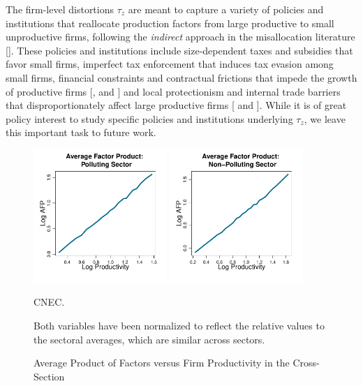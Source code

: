 \documentclass[AEJ]{AEA}
\begin{document}
The firm-level distortions $\tau_z$ are meant to capture a variety of policies and institutions that reallocate production factors from large productive to small unproductive firms, following the \emph{indirect} approach in the misallocation literature [\citet{RestucciaRogerson:2013,RestucciaRogerson:2017}]. These policies and institutions include size-dependent taxes and subsidies that favor small firms, imperfect tax enforcement that induces tax evasion among small firms, financial constraints and contractual frictions that impede the growth of productive firms [\citet{CooleyQuadrini:2001}, \citet{ClementiHopenhayn:2006} and \citet{Akcigitetal:2018}] and local protectionism and internal trade barriers that disproportionately affect large productive firms [\citet{Eberhardtetal:2016} and \citet{TombeZhu:2015}]. While it is of great policy interest to study specific policies and institutions underlying $\tau_z$, we leave this important task to future work.

\begin{figure}[t]
    \begin{center}
    \includegraphics[width=0.45\textwidth]{./Figures/apf_pol_weight.pdf}
    \includegraphics[width=0.45\textwidth]{./Figures/apf_npol_weight.pdf}
    \caption{Average Product of Factors versus Firm Productivity in the Cross-Section}
    \begin{figurenotes}[Source]
        CNEC.
    \end{figurenotes}
    \begin{figurenotes}
        Both variables have been normalized to reflect the relative values to the sectoral averages, which are similar across sectors.
    \end{figurenotes}
    \label{fig:apf}
    \end{center}
\end{figure}
\end{document}
